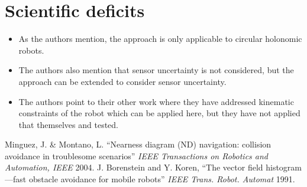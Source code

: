 \documentclass[12pt]{article}
\begin{document}
\section{Scientific deficits}
\begin{itemize}
    \item As the authors mention, the approach is only applicable to circular holonomic robots.
    \item The authors also mention that sensor uncertainty is not considered, but the approach can be extended to consider sensor uncertainty.
    \item The authors point to their other work where they have addressed kinematic constraints of the robot which can be applied here, but they have not applied that themselves and tested.
\end{itemize}

\begin{thebibliography}{1}
     Minguez, J. \& Montano, L. ``Nearness diagram (ND) navigation: collision avoidance in troublesome scenarios'' \textit{IEEE Transactions on Robotics and Automation, IEEE} 2004.
     J. Borenstein and Y. Koren, ``The vector field histogram—fast obstacle avoidance for mobile robots'' \textit{IEEE Trans. Robot. Automat} 1991.
\end{thebibliography}
\end{document}

